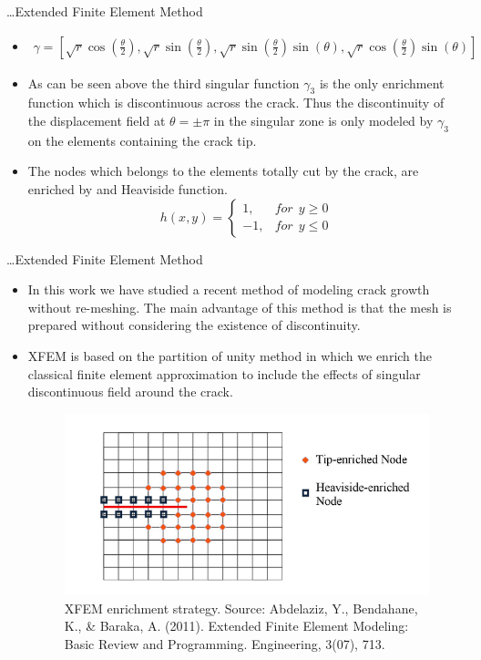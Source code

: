 \documentclass{beamer}
\begin{document}
\begin{frame}[t,fragile]{\ldots Extended Finite Element Method }
    \begin{itemize}
        \item 
            \footnotesize \begin{align*}
\gamma=\left[ \sqrt{r}\cos \left( \frac{\theta}{2} \right), \sqrt{r}\sin\left( \frac{\theta}{2} \right),\sqrt{r}\sin\left( \frac{\theta}{2} \right)\sin(\theta),\sqrt{r}\cos\left( \frac{\theta}{2} \right)\sin(\theta)\right] 
\end{align*}
\item As can be seen above the third singular function $\gamma_3$ is the only enrichment function which is discontinuous across the crack. Thus the discontinuity of the displacement field at $\theta=\pm \pi$ in the singular zone is only modeled by $\gamma_3$ on the elements containing the crack tip.
\item The nodes which belongs to the elements totally cut by the crack, are enriched by and Heaviside function.
    $$h(x,y)=\begin{cases}1,&       for ~ ~ y\ge 0\\ -1,&       for~ ~ y\le 0\end{cases}$$

    \end{itemize}
\end{frame}
\begin{frame}[t,fragile]{\ldots Extended Finite Element Method}
    \begin{itemize}
        \item In this work we have studied a recent method of modeling crack growth without re-meshing. The main advantage of this method is that the mesh is prepared without considering the existence of discontinuity.
        \item XFEM is based on the partition of unity method in which we enrich the classical finite element approximation to include the effects of singular discontinuous field around the crack.
            \begin{figure}[h]
                \centering
                \includegraphics[scale=.2]{enrich.png}
                \caption{XFEM enrichment strategy. Source: Abdelaziz, Y., Bendahane, K., \& Baraka, A. (2011). Extended Finite Element Modeling: Basic Review and Programming. Engineering, 3(07), 713.}
                \label{3}
            \end{figure}
    \end{itemize}
\end{frame}
\end{document}
